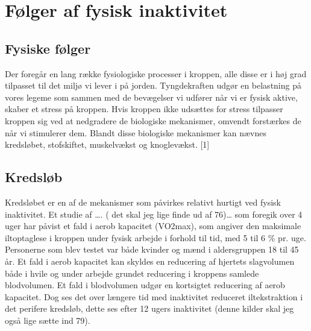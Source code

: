 \section{Følger af fysisk inaktivitet}

\subsection{Fysiske følger}

Der foregår en lang række fysiologiske processer i kroppen, alle disse er i høj grad tilpasset til det miljø vi lever i på jorden. Tyngdekraften udgør en belastning på vores legeme som sammen med de bevægelser vi udfører når vi er fysisk aktive, skaber et stress på kroppen. Hvis kroppen ikke udsættes for stress tilpasser kroppen sig ved at nedgradere de biologiske mekanismer, omvendt forstærkes de når vi stimulerer dem. Blandt disse biologiske mekanismer kan nævnes kredsløbet, stofskiftet, muskelvækst og knoglevækst. [1]

\subsection{Kredsløb}
Kredsløbet er en af de mekanismer som påvirkes relativt hurtigt ved fysisk inaktivitet. Et studie af …. ( det skal jeg lige finde ud af 76)… som foregik over 4 uger har påvist et fald i aerob kapacitet (VO2max), som angiver den maksimale iltoptaglese i kroppen under fysisk arbejde i forhold til tid, med 5 til 6 \% pr. uge. Personerne som blev testet var både kvinder og mænd i aldersgruppen 18 til 45 år. Et fald i aerob kapacitet kan skyldes en reducering af hjertets slagvolumen både i hvile og under arbejde grundet reducering i kroppens samlede blodvolumen. Et fald i blodvolumen udgør en kortsigtet reducering af aerob kapacitet. Dog ses det over længere tid med inaktivitet reduceret iltekstraktion i det perifere kredsløb, dette ses efter 12 ugers inaktivitet (denne kilder skal jeg også lige sætte ind 79).

